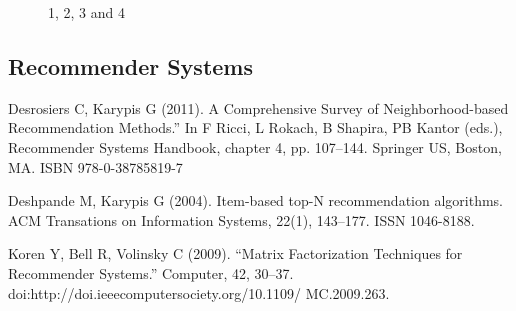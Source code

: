 \begin{figure}[H]
	\centering
	\begin{minipage}[b]{0.5\linewidth}
	\end{minipage}\hfill
	\begin{minipage}[b]{0.5\linewidth}
	\end{minipage}\hfill	
	\begin{minipage}[b]{0.5\linewidth}
	\end{minipage}\hfill
	\begin{minipage}[b]{0.5\linewidth}
	\end{minipage}\hfill
	\caption{1, 2, 3 and 4}
	\label{fig:Figure1}
\end{figure} 



\begin{thebibliography}{00}

\subsection{Recommender Systems}

Desrosiers C, Karypis G (2011). 
\newblock A Comprehensive Survey of Neighborhood-based Recommendation Methods.” In F Ricci, L Rokach, B Shapira, PB Kantor (eds.), 
\newblock Recommender Systems Handbook, chapter 4, pp. 107–144. Springer US, Boston, MA. ISBN 978-0-38785819-7

Deshpande M, Karypis G (2004). 
\newblock Item-based top-N recommendation algorithms.
\newblock ACM Transations on Information Systems, 22(1), 143–177. ISSN 1046-8188.

Koren Y, Bell R, Volinsky C (2009). 
\newblock “Matrix Factorization Techniques for Recommender Systems.” 
\newblock Computer, 42, 30–37. doi:http://doi.ieeecomputersociety.org/10.1109/ MC.2009.263.


\end{thebibliography}


